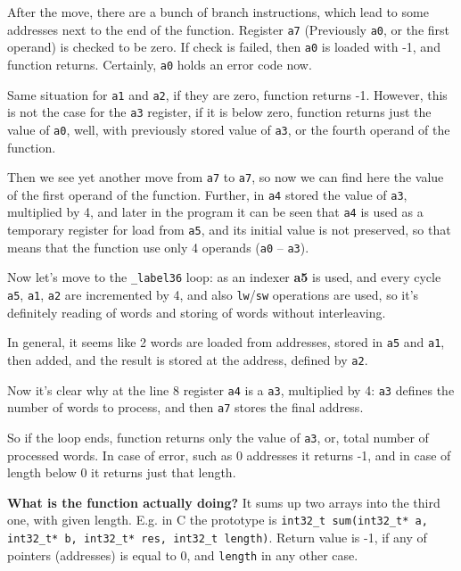 \documentclass[a4paper]{article}
\begin{document}
After the move, there are a bunch of branch instructions, which lead to some addresses next to the end of the function. Register \texttt{a7} (Previously \texttt{a0}, or the first operand) is checked to be zero. If check is failed, then \texttt{a0} is loaded with -1, and function returns. Certainly, \texttt{a0} holds an error code now.

Same situation for \texttt{a1} and \texttt{a2}, if they are zero, function returns -1.
However, this is not the case for the \texttt{a3} register, if it is below zero, function returns just the value of \texttt{a0}, well, with previously stored value of \texttt{a3}, or the fourth operand of the function.

Then we see yet another move from \texttt{a7} to \texttt{a7}, so now we can find here the value of the first operand of the function.
Further, in \texttt{a4} stored the value of \texttt{a3}, multiplied by 4, and later in the program it can be seen that \texttt{a4} is used as a temporary register for load from \texttt{a5}, and its initial value is not preserved, so that means that the function use only 4 operands (\texttt{a0} -- \texttt{a3}).

Now let's move to the \texttt{\_label36} loop: as an indexer \textbf{a5} is used, and every cycle \texttt{a5}, \texttt{a1}, \texttt{a2} are incremented by 4, and also \texttt{lw}/\texttt{sw} operations are used, so it's definitely reading of words and storing of words without interleaving.

In general, it seems like 2 words are loaded from addresses, stored in \texttt{a5} and \texttt{a1}, then added, and the result is stored at the address, defined by \texttt{a2}.

Now it's clear why at the line 8 register \texttt{a4} is a \texttt{a3}, multiplied by 4: \texttt{a3} defines the number of words to process, and then \texttt{a7} stores the final address.

So if the loop ends, function returns only the value of \texttt{a3}, or, total number of processed words. In case of error, such as 0 addresses it returns -1, and in case of length below 0 it returns just that length.

\textbf{What is the function actually doing?} It sums up two arrays into the third one, with given length. E.g. in C the prototype is \texttt{int32\_t sum(int32\_t* a, int32\_t* b, int32\_t* res, int32\_t length)}. Return value is -1, if any of pointers (addresses) is equal to 0, and \texttt{length} in any other case.
\end{document}
